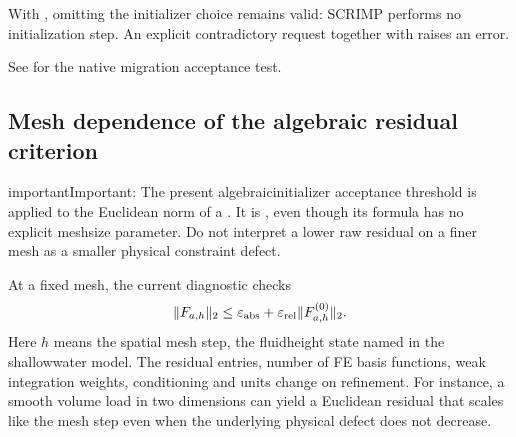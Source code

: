 \documentclass[letterpaper,10pt,english]{sphinxmanual}
\begin{document}
\sphinxAtStartPar
With , omitting the initializer
choice remains valid: SCRIMP performs no
initialization step. An explicit contradictory
request  together
with  raises an error.

\sphinxAtStartPar
See 
for the native migration acceptance test.


\subsection{Mesh dependence of the algebraic residual criterion}
\label{\detokenize{initialization:mesh-dependence-of-the-algebraic-residual-criterion}}
\begin{sphinxadmonition}{important}{Important:}
\sphinxAtStartPar
The present algebraic\sphinxhyphen{}initializer acceptance threshold is applied
to the Euclidean norm of a .
It is , even though its formula has
no explicit mesh\sphinxhyphen{}size parameter. Do not interpret a lower raw
residual on a finer mesh as a smaller physical constraint defect.
\end{sphinxadmonition}

\sphinxAtStartPar
At a fixed mesh, the current diagnostic checks
\begin{equation*}
\begin{split}\|F_{a,h}\|_2 \leq \varepsilon_{\rm abs}
+ \varepsilon_{\rm rel}\|F_{a,h}^{(0)}\|_2.\end{split}
\end{equation*}
\sphinxAtStartPar
Here \(h\) means the spatial mesh step,  the
fluid\sphinxhyphen{}height state named  in the shallow\sphinxhyphen{}water model.
The residual entries, number of FE basis functions, weak
integration weights, conditioning and units change on refinement.
For instance, a smooth volume load in two dimensions can yield
a Euclidean residual that scales like the mesh step even when
the underlying physical defect does not decrease.
\end{document}
